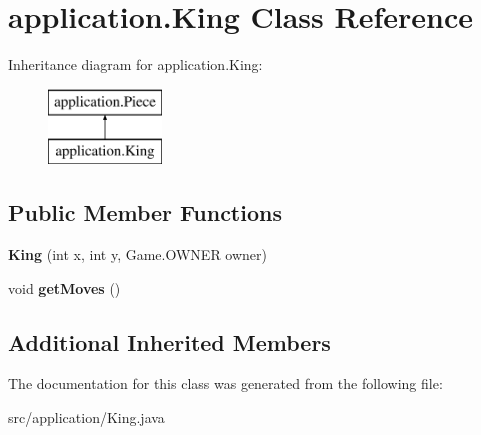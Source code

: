 \hypertarget{classapplication_1_1_king}{\section{application.\+King Class Reference}
\label{classapplication_1_1_king}
}
Inheritance diagram for application.\+King\+:\begin{figure}[H]
\begin{center}
\leavevmode
\includegraphics[height=2.000000cm]{classapplication_1_1_king}
\end{center}
\end{figure}
\subsection*{Public Member Functions}
\begin{DoxyCompactItemize}
\item 
\hypertarget{classapplication_1_1_king_aaf752b3e54e7ef1c51263c2493212a5f}{{\bfseries King} (int x, int y, Game.\+O\+W\+N\+E\+R owner)}\label{classapplication_1_1_king_aaf752b3e54e7ef1c51263c2493212a5f}

\item 
\hypertarget{classapplication_1_1_king_adb6361fe24a37fbe385e8e3aa626163e}{void {\bfseries get\+Moves} ()}\label{classapplication_1_1_king_adb6361fe24a37fbe385e8e3aa626163e}

\end{DoxyCompactItemize}
\subsection*{Additional Inherited Members}


The documentation for this class was generated from the following file\+:\begin{DoxyCompactItemize}
\item 
src/application/King.\+java\end{DoxyCompactItemize}
